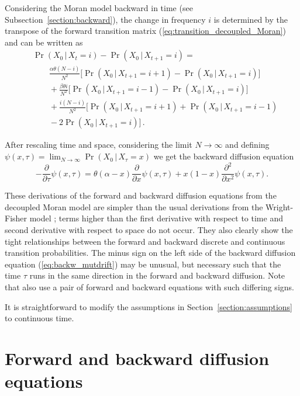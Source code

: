 \documentclass[preprint]{elsarticle}
\newcommand\given{{\,|\,}}
\newcommand\x[1]{\ensuremath{X_{#1}}}
\begin{document}
Considering the Moran model backward in time (see Subsection~\ref{section:backward}), the change in frequency $i$ is determined by the transpose of the forward transition matrix (\ref{eq:transition_decoupled_Moran}) and can be written as
\begin{equation}\label{eq:back_discr_mutation}
\begin{split}
&\Pr(\x{0} \given\x{t}=i)-\Pr(\x{0}\given\x{t+1}=i) = \\
&\qquad \frac{\alpha \theta (N-i)}{N^2} \bigg[\Pr(\x{0}\given\x{t+1}=i+1)-\Pr(\x{0}\given\x{t+1}=i)\bigg]\\
&\qquad+ \frac{\beta \theta i}{N^2} \bigg[\Pr(\x{0}\given\x{t+1}=i-1)-\Pr(\x{0}\given\x{t+1}=i)\bigg]\\
&\qquad+ \frac{i(N-i)}{N^2} \bigg[\Pr(\x{0}\given\x{t+1}=i+1)+\Pr(\x{0}\given\x{t+1}=i-1)\\
&\qquad-2\Pr(\x{0}\given\x{t+1}=i)\bigg]\,.
\end{split}
\end{equation}

After rescaling time and space, considering the limit $N \to \infty$ and defining $\psi(x,\tau)=\lim_{N\to\infty}\Pr(\x{0}\given\x{\tau}=x)$ we get the backward diffusion equation
\begin{equation}\label{eq:backw_mutdrift}
-\frac{\partial}{\partial \tau} \psi(x,\tau) =
    \theta(\alpha-x)\frac{\partial}{\partial x} \psi(x,\tau) +x(1-x)\frac{\partial^2}{\partial x^2}\psi(x,\tau).
\end{equation}

These derivations of the forward and backward diffusion equations from the decoupled Moran model are simpler than the usual derivations from the Wright-Fisher model \citep{Ewen04}; terms higher than the first derivative with respect to time and second derivative with respect to space do not occur. They also clearly show the tight relationships between the forward and backward discrete and continuous transition probabilities. The minus sign on the left side of the backward diffusion equation (\ref{eq:backw_mutdrift}) may be unusual, but necessary such that the time $\tau$ runs in the same direction in the forward and backward diffusion. Note that \citet{Zhao13a} also use a pair of forward and backward equations with such differing signs.

It is straightforward to modify the assumptions in Section~\ref{section:assumptions} to continuous time.

\section{Forward and backward diffusion equations}
\end{document}
